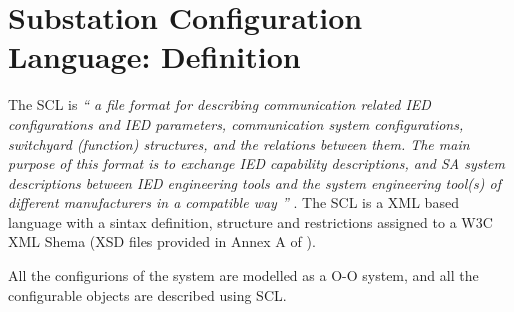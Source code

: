 \section{Substation Configuration Language: Definition}
\label{sec:ch-scl--SCL-definition}
The \gls{SCL} is
\emph{
``
	a file format for describing communication related
	\gls{IED} configurations and \gls{IED} parameters, 
	communication system configurations, 
	switchyard (function) structures, and the
	relations between them. The main purpose of this format 
	is to exchange IED capability descriptions, 
	and SA system descriptions 
	between \gls{IED} engineering tools and the system
	engineering tool(s) of different manufacturers 
	in a compatible way
''
} \cite{IEC61850-6:2004}. The \gls{SCL} is a \gls{XML} based 
language with a sintax definition, structure and restrictions 
assigned to a W3C XML Shema \cite{W3CXSD:2001} (\gls{XSD} files
provided in Annex A of \cite{IEC61850-6:2004}). 

All the configurions of the system are modelled 
as a \gls{O-O} system, and all the configurable 
objects are described using \gls{SCL}. 